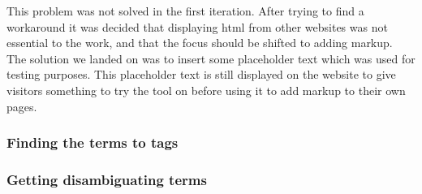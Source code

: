 This problem was not solved in the first iteration.
After trying to find a workaround it was decided that displaying html from other websites was not essential to the work,
and that the focus should be shifted to adding markup.
The solution we landed on was to insert some placeholder text which was used for testing purposes.
This placeholder text is still displayed on the website to give visitors something to try the tool on before using it
to add markup to their own pages.

\subsubsection{Finding the terms to tags}


\subsubsection{Getting disambiguating terms}

